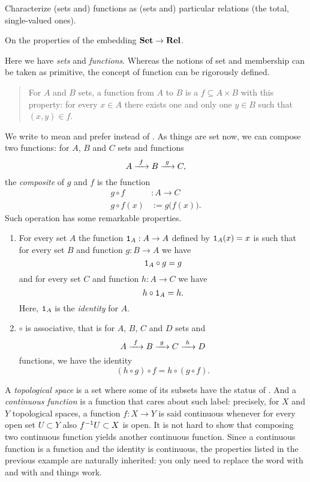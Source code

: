Characterize (sets and) functions as (sets and) particular relations (the total, single-valued ones).\tba

On the properties of the embedding $\mathbf{Set} \to \mathbf{Rel}$.\tba
\begin{example}
Here we have {\em sets} and {\em functions}. Whereas the notions of set and membership can be taken as primitive, the concept of function can be rigorously defined.
\begin{quotation}
For \(A\) and \(B\) sets, a function from \(A\) to \(B\) is a \(f \subseteq A \times B\) with this property: for every \(x \in A\) there exists one and only one \(y \in B\) such that \((x, y ) \in f\).
\end{quotation}
We write  to mean  and prefer  instead of . As things are set now, we can compose two functions: for \(A\), \(B\) and \(C\) sets and  functions
\[A \xrightarrow{\ f\ } B \xrightarrow{\ g\ } C ,\]
the {\em composite} of \(g\) and \(f\) is the function
\begin{align*}
g \circ f &: A \to C \\
g \circ f(x) &:= g\big(f(x)\big) .
\end{align*}
Such operation has some remarkable properties.
\begin{enumerate}
\item For every set \(A\) the function \(\mathtt 1_A : A \to A\) defined by \(\mathtt 1_A(x) = x\) is such that for every set \(B\) and function \(g : B \to A\) we have
\[\mathtt 1_A \circ g = g\]
and for every set \(C\) and function \(h : A \to C\) we have
\[h \circ \mathtt 1_A = h .\]
Here, \(\mathtt 1_A\) is the {\em identity} for \(A\).
\item \(\circ\) is associative, that is for \(A\), \(B\), \(C\) and \(D\) sets and
\[A \xrightarrow{\ f\ } B \xrightarrow{\ g\ } C \xrightarrow{\ h\ } D\]
functions, we have the identity
\[(h \circ g) \circ f = h \circ (g \circ f) .\]
\end{enumerate}
\end{example}

\begin{example}[Topology]
A {\em topological space} is a set where some of its subsets have the status of . And a {\em continuous function} is a function that cares about such label: precisely, for \(X\) and \(Y\) topological spaces, a function \(f : X \to Y\) is said continuous whenever for every open set \(U \subset Y\) also \(f^{-1} U \subset X\) is open. It is not hard to show that composing two continuous function yields another continuous function. Since a continuous function is a function and the identity is continuous, the properties listed in the previous example are naturally inherited: you only need to replace the word  with  and  with  and things work.
\end{example}

